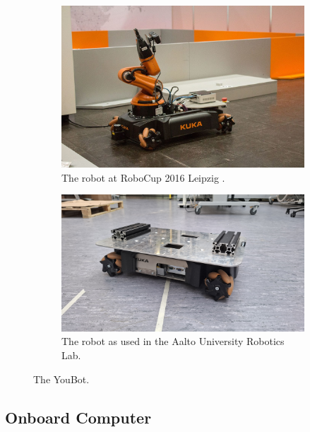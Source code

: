 \documentclass[a4paper, 12pt]{article}
\begin{document}
    \begin{figure}[H]
        \centering
        \begin{subfigure}[t]{0.49\linewidth}
            \centering
            \includegraphics[width=\linewidth]{images/sec2/youbot_with_arm.png}
            \caption{The robot at RoboCup 2016 Leipzig \cite{ubahnverleih2016}.}
        \end{subfigure}
        \hfill
        \begin{subfigure}[t]{0.49\linewidth}
            \centering
            \includegraphics[width=\linewidth]{images/sec2/youbot_irl.jpg}
            \caption{The robot as used in the Aalto University Robotics Lab.}
            \label{fig:youbot-aalto}
        \end{subfigure}
        \caption{The YouBot.}
    \end{figure}

    \subsection{Onboard Computer}
\end{document}
